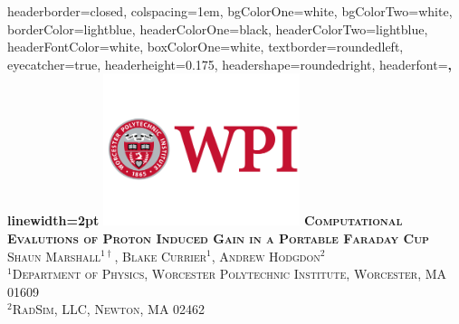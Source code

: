 \documentclass[landscape,archE1,fontscale=0.285]{baposter} %
\begin{document}
\begin{poster}
{
headerborder=closed, %
colspacing=1em, %
bgColorOne=white, %
bgColorTwo=white, %
borderColor=lightblue, %
headerColorOne=black, %
headerColorTwo=lightblue, %
headerFontColor=white, %
boxColorOne=white, %
textborder=roundedleft, %
eyecatcher=true, %
headerheight=0.175\textheight, %
headershape=roundedright, %
headerfont=\Large\bf\textsc, %
linewidth=2pt %
}
%
{\includegraphics[height=12em]{figures/Inst-Prim-FulClr.png}} %
{\bf\textsc{Computational Evalutions of Proton Induced Gain in a Portable Faraday Cup}\vspace{0.2em}} %
{\textsc{Shaun Marshall$^{1\dag}$, Blake Currier$^1$, Andrew Hodgdon$^2$ \\$^1$Department of Physics, Worcester Polytechnic Institute, Worcester, MA 01609\\ $^2$RadSim, LLC, Newton, MA 02462}} \\ %


\end{poster}
\end{document}
